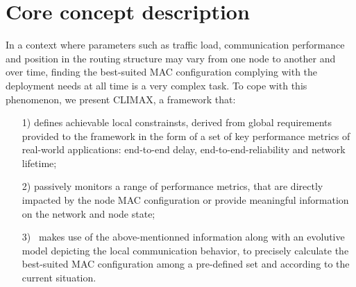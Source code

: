 \documentclass[12pt,journal,compsoc]{IEEEtran}
\begin{document}

\section{Core concept description}
\label{contrib}

In a context where parameters such as traffic load, communication performance and position in the routing structure may vary from one node to another and over time, finding the best-suited MAC configuration complying with the deployment needs at all time is a very complex task.
To cope with this phenomenon, we present CLIMAX, a framework that:

\begin{itemize}
	\item[1) ] defines achievable local constrainsts, derived from global requirements provided to the framework in the form of a set of key performance metrics of real-world applications: end-to-end delay, end-to-end-reliability and network lifetime;
	\item[2) ] passively monitors a range of performance metrics, that are directly impacted by the node MAC configuration or provide meaningful information on the network and node state;
	\item[3)] ~makes use of the above-mentionned information along with an evolutive model depicting the local communication behavior, to precisely calculate the best-suited MAC configuration among a pre-defined set and according to the current situation.
\end{itemize}
\end{document}
